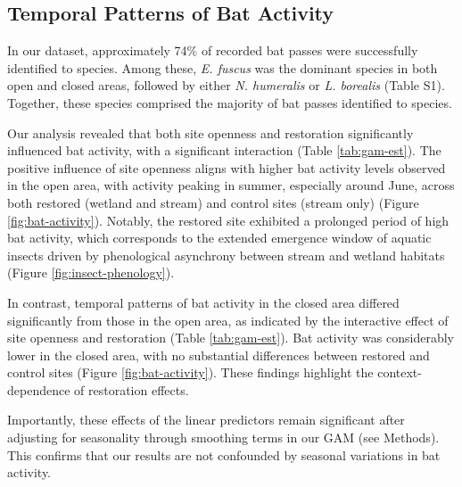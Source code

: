 \documentclass[11pt, class=article, crop=false]{standalone}
\begin{document}
\subsection{Temporal Patterns of Bat Activity}

In our dataset, approximately 74\% of recorded bat passes were successfully identified to species. Among these, \textit{E. fuscus} was the dominant species in both open and closed areas, followed by either \textit{N. humeralis} or \textit{L. borealis} (Table S1).
Together, these species comprised the majority of bat passes identified to species.

Our analysis revealed that both site openness and restoration significantly influenced bat activity, with a significant interaction (Table \ref{tab:gam-est}).
The positive influence of site openness aligns with higher bat activity levels observed in the open area, with activity peaking in summer, especially around June, across both restored (wetland and stream) and control sites (stream only) (Figure \ref{fig:bat-activity}).
Notably, the restored site exhibited a prolonged period of high bat activity, which corresponds to the extended emergence window of aquatic insects driven by phenological asynchrony between stream and wetland habitats (Figure \ref{fig:insect-phenology}).

In contrast, temporal patterns of bat activity in the closed area differed significantly from those in the open area, as indicated by the interactive effect of site openness and restoration (Table \ref{tab:gam-est}).
Bat activity was considerably lower in the closed area, with no substantial differences between restored and control sites (Figure \ref{fig:bat-activity}).
These findings highlight the context-dependence of restoration effects.



Importantly, these effects of the linear predictors remain significant after adjusting for seasonality through smoothing terms in our GAM (see Methods).
This confirms that our results are not confounded by seasonal variations in bat activity.
\end{document}
